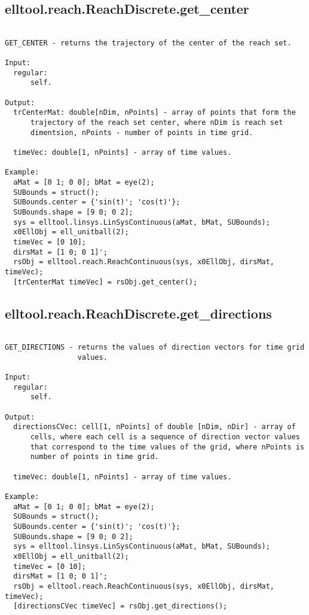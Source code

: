 \subsection{\texorpdfstring{elltool.reach.ReachDiscrete.get\_center}{get\_center}}\label{method:elltool.reach.ReachDiscrete.getcenter}
\begin{verbatim}

GET_CENTER - returns the trajectory of the center of the reach set.

Input:
  regular:
      self.

Output:
  trCenterMat: double[nDim, nPoints] - array of points that form the
      trajectory of the reach set center, where nDim is reach set
      dimentsion, nPoints - number of points in time grid.

  timeVec: double[1, nPoints] - array of time values.

Example:
  aMat = [0 1; 0 0]; bMat = eye(2);
  SUBounds = struct();
  SUBounds.center = {'sin(t)'; 'cos(t)'};
  SUBounds.shape = [9 0; 0 2];
  sys = elltool.linsys.LinSysContinuous(aMat, bMat, SUBounds);
  x0EllObj = ell_unitball(2);
  timeVec = [0 10];
  dirsMat = [1 0; 0 1]';
  rsObj = elltool.reach.ReachContinuous(sys, x0EllObj, dirsMat, timeVec);
  [trCenterMat timeVec] = rsObj.get_center();
\end{verbatim}
\subsection{\texorpdfstring{elltool.reach.ReachDiscrete.get\_directions}{get\_directions}}\label{method:elltool.reach.ReachDiscrete.getdirections}
\begin{verbatim}

GET_DIRECTIONS - returns the values of direction vectors for time grid
                 values.

Input:
  regular:
      self.

Output:
  directionsCVec: cell[1, nPoints] of double [nDim, nDir] - array of
      cells, where each cell is a sequence of direction vector values
      that correspond to the time values of the grid, where nPoints is
      number of points in time grid.

  timeVec: double[1, nPoints] - array of time values.

Example:
  aMat = [0 1; 0 0]; bMat = eye(2);
  SUBounds = struct();
  SUBounds.center = {'sin(t)'; 'cos(t)'};
  SUBounds.shape = [9 0; 0 2];
  sys = elltool.linsys.LinSysContinuous(aMat, bMat, SUBounds);
  x0EllObj = ell_unitball(2);
  timeVec = [0 10];
  dirsMat = [1 0; 0 1]';
  rsObj = elltool.reach.ReachContinuous(sys, x0EllObj, dirsMat, timeVec);
  [directionsCVec timeVec] = rsObj.get_directions();
\end{verbatim}
